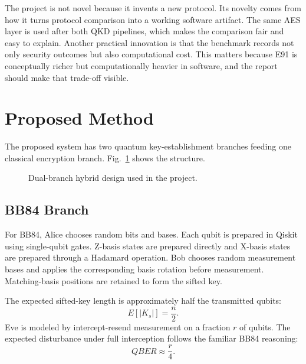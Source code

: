\documentclass[conference]{IEEEtran}
\begin{document}
The project is not novel because it invents a new protocol. Its novelty comes from how it turns protocol comparison into a working software artifact. The same AES layer is used after both QKD pipelines, which makes the comparison fair and easy to explain. Another practical innovation is that the benchmark records not only security outcomes but also computational cost. This matters because E91 is conceptually richer but computationally heavier in software, and the report should make that trade-off visible.

\section{Proposed Method}
The proposed system has two quantum key-establishment branches feeding one classical encryption branch. Fig.~\ref{fig:method} shows the structure.

\begin{figure}[htbp]
\centering
{}
\caption{Dual-branch hybrid design used in the project.}
\label{fig:method}
\end{figure}

\subsection{BB84 Branch}
For BB84, Alice chooses random bits and bases. Each qubit is prepared in Qiskit using single-qubit gates. Z-basis states are prepared directly and X-basis states are prepared through a Hadamard operation. Bob chooses random measurement bases and applies the corresponding basis rotation before measurement. Matching-basis positions are retained to form the sifted key.

The expected sifted-key length is approximately half the transmitted qubits:
\begin{equation}
E[|K_s|] = \frac{n}{2}.
\end{equation}
Eve is modeled by intercept-resend measurement on a fraction $r$ of qubits. The expected disturbance under full interception follows the familiar BB84 reasoning:
\begin{equation}
QBER \approx \frac{r}{4}.
\end{equation}
\end{document}
